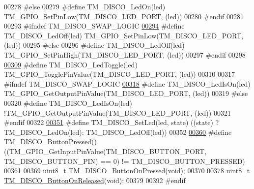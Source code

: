 \begin{DoxyCode}
00278 \textcolor{preprocessor}{#else}
00279 \textcolor{preprocessor}{    #define TM\_DISCO\_LedOn(led)         TM\_GPIO\_SetPinLow(TM\_DISCO\_LED\_PORT, (led))}
00280 \textcolor{preprocessor}{#endif}
00281 
00293 \textcolor{preprocessor}{#ifndef TM\_DISCO\_SWAP\_LOGIC}
\hypertarget{tm__stm32f4__disco_8h_source_l00294}{}\hyperlink{group___t_m___d_i_s_c_o___functions_gab295e2ecb3dc81210a9af3f5281cae79}{00294} \textcolor{preprocessor}{    #define TM\_DISCO\_LedOff(led)            TM\_GPIO\_SetPinLow(TM\_DISCO\_LED\_PORT, (led))}
00295 \textcolor{preprocessor}{#else}
00296 \textcolor{preprocessor}{    #define TM\_DISCO\_LedOff(led)            TM\_GPIO\_SetPinHigh(TM\_DISCO\_LED\_PORT, (led))}
00297 \textcolor{preprocessor}{#endif}
00298 
\hypertarget{tm__stm32f4__disco_8h_source_l00309}{}\hyperlink{group___t_m___d_i_s_c_o___functions_gaacaee2ef25adf5ff2cc2be660b561d94}{00309} \textcolor{preprocessor}{#define TM\_DISCO\_LedToggle(led)     TM\_GPIO\_TogglePinValue(TM\_DISCO\_LED\_PORT, (led))}
00310 
00317 \textcolor{preprocessor}{#ifndef TM\_DISCO\_SWAP\_LOGIC}
\hypertarget{tm__stm32f4__disco_8h_source_l00318}{}\hyperlink{group___t_m___d_i_s_c_o___functions_ga88ebf703816bec3e79e60fef9c469950}{00318} \textcolor{preprocessor}{#define TM\_DISCO\_LedIsOn(led)       TM\_GPIO\_GetOutputPinValue(TM\_DISCO\_LED\_PORT, (led))}
00319 \textcolor{preprocessor}{#else}
00320 \textcolor{preprocessor}{#define TM\_DISCO\_LedIsOn(led)       !TM\_GPIO\_GetOutputPinValue(TM\_DISCO\_LED\_PORT, (led))}
00321 \textcolor{preprocessor}{#endif}
00322 
\hypertarget{tm__stm32f4__disco_8h_source_l00351}{}\hyperlink{group___t_m___d_i_s_c_o___functions_ga45b9e10ff16b153c3d26db3a23481623}{00351} \textcolor{preprocessor}{#define TM\_DISCO\_SetLed(led, state) ((state) ? TM\_DISCO\_LedOn(led): TM\_DISCO\_LedOff(led))}
00352 
\hypertarget{tm__stm32f4__disco_8h_source_l00360}{}\hyperlink{group___t_m___d_i_s_c_o___functions_ga02c997906998f75a6cd676810022f9b3}{00360} \textcolor{preprocessor}{#define TM\_DISCO\_ButtonPressed()    ((TM\_GPIO\_GetInputPinValue(TM\_DISCO\_BUTTON\_PORT, TM\_DISCO\_BUTTON\_PIN)
       == 0) != TM\_DISCO\_BUTTON\_PRESSED)}
00361 
00369 uint8\_t \hyperlink{group___t_m___d_i_s_c_o___functions_ga24330bb47f3ed88ae841054a8023cd2a}{TM\_DISCO\_ButtonOnPressed}(\textcolor{keywordtype}{void});
00370 
00378 uint8\_t \hyperlink{group___t_m___d_i_s_c_o___functions_ga3b6eee495f312c38eefaa90c40ccff5a}{TM\_DISCO\_ButtonOnReleased}(\textcolor{keywordtype}{void});
00379 
00392 \textcolor{preprocessor}{#endif}
\end{DoxyCode}
